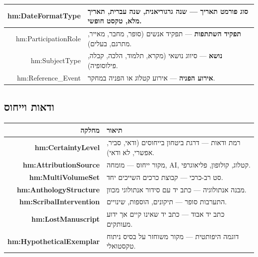 \documentclass[12pt,a4paper]{article}
\newcommand{\new}[1]{\textcolor{newaddition}{#1}}
\newcommand{\newclass}[1]{\textcolor{newaddition}{\textbf{#1}}}
\begin{document}
\begin{longtable}{|r|p{10cm}|}
\new{hm:DateFormatType} & 
\new{\textbf{סוג פורמט תאריך} — שנה גרגוריאנית, שנה עברית, תאריך מלא, טקסט חופשי.}\\
\hline

hm:ParticipationRole & 
\textbf{תפקיד השתתפות} — תפקיד אנשים (סופר, מחבר, מאייר, מתרגם, בעלים).\\
\hline

hm:SubjectType & 
\textbf{נושא} — סיווג נושאי (מקרא, תלמוד, הלכה, קבלה, פילוסופיה).\\
\hline

hm:Reference\_Event & 
\textbf{אירוע הפניה} — אירוע קטלוג או הפניה במחקר.\\
\hline
\end{longtable}

\subsection{\new{ ודאות וייחוס}}

\begin{longtable}{|r|p{10cm}|}
\hline
\textbf{מחלקה} & \textbf{תיאור} \\
\hline
\endhead

\newclass{hm:CertaintyLevel} & 
\new{רמת ודאות — דרגת ביטחון בייחוסים (ודאי, סביר, אפשרי, לא ודאי).}\\
\hline

\newclass{hm:AttributionSource} & 
\new{מקור ייחוס — מומחה, AI, קטלוג, קולופון, פליאוגרפי.}\\
\hline

\newclass{hm:MultiVolumeSet} & 
\new{סט רב-כרכי — קבוצת כרכים השייכים יחד.}\\
\hline

\newclass{hm:AnthologyStructure} & 
\new{מבנה אנתולוגיה — כתב יד עם סידור אנתולוגי מכוון.}\\
\hline

\newclass{hm:ScribalIntervention} & 
\new{התערבות סופר — תיקונים, הוספות, שינויים.}\\
\hline

\newclass{hm:LostManuscript} & 
\new{כתב יד אבוד — כתב יד שאינו קיים אך ידוע מעותקים.}\\
\hline

\newclass{hm:HypotheticalExemplar} & 
\new{דוגמה היפותטית — מקור משוחזר על בסיס ניתוח טקסטואלי.}\\
\hline
\end{longtable}
\end{document}
